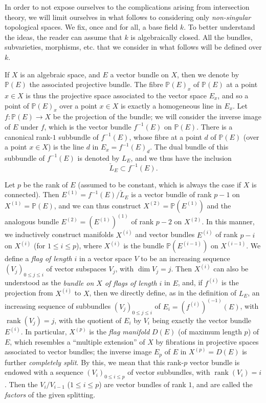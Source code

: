 \documentclass{article}
\begin{document}
In order to not expose ourselves to the complications arising from intersection theory, we will limit ourselves in what follows to considering only \emph{non-singular} topological spaces.
We fix, once and for all, a base field \(k\).
To better understand the ideas, the reader can assume that \(k\) is algebraically closed.
All the bundles, subvarieties, morphisms, etc. that we consider in what follows will be defined over \(k\).

If \(X\) is an algebraic space, and \(E\) a vector bundle on \(X\), then we denote by \(\mathbb{P}(E)\) the associated projective bundle.
The fibre \(\mathbb{P}(E)_x\) of \(\mathbb{P}(E)\) at a point \(x\in X\) is thus the projective space associated to the vector space \(E_x\), and so a point of \(\mathbb{P}(E)_x\) over a point \(x\in X\) is exactly a homogeneous line in \(E_x\).
Let \(f\colon\mathbb{P}(E)\to X\) be the projection of the bundle;
we will consider the inverse image of \(E\) under \(f\), which is the vector bundle \(f^{-1}(E)\) on \(\mathbb{P}(E)\).
There is a canonical rank-\(1\) subbundle of \(f^{-1}(E)\), whose fibre at a point \(d\) of \(\mathbb{P}(E)\) (over a point \(x\in X\)) is the line \(d\) in \(E_x=f^{-1}(E)_d\).
The dual bundle of this subbundle of \(f^{-1}(E)\) is denoted by \(L_E\), and we thus have the inclusion
\[
  \check{L}_E \subset f^{-1}(E).
\]

Let \(p\) be the rank of \(E\) (assumed to be constant, which is always the case if \(X\) is connected).
Then \(E^{(1)}=f^{-1}(E)/\check{L}_E\) is a vector bundle of rank \(p-1\) on \(X^{(1)}=\mathbb{P}(E)\), and we can thus construct \(X^{(2)}=\mathbb{P}(E^{(1)})\) and the analogous bundle \(E^{(2)}=(E^{(1)})^{(1)}\) of rank \(p-2\) on \(X^{(2)}\).
In this manner, we inductively construct manifolds \(X^{(i)}\) and vector bundles \(E^{(i)}\) of rank \(p-i\) on \(X^{(i)}\) (for \(1\leqslant i\leqslant p\)), where \(X^{(i)}\) is the bundle \(\mathbb{P}(E^{(i-1)})\) on \(X^{(i-1)}\).
We define a \emph{flag of length \(i\)} in a vector space \(V\) to be an increasing sequence \((V_j)_{0\leqslant j\leqslant i}\) of vector subspaces \(V_j\), with \(\dim V_j=j\).
Then \(X^{(i)}\) can also be understood as the \emph{bundle on \(X\) of flags of length \(i\)} in \(E\), and, if \(f^{(i)}\) is the projection from \(X^{(i)}\) to \(X\), then we directly define, as in the definition of \(L_E\), an increasing sequence of subbundles \((V_j)_{0\leqslant j\leqslant i}\) of \(E_i=(f^{(i)})^{(-1)}(E)\), with \(\operatorname{rank}(V_j)=j\), with the quotient of \(E_i\) by \(V_i\) being exactly the vector bundle \(E^{(i)}\).
In particular, \(X^{(p)}\) is the \emph{flag manifold} \(D(E)\) (of maximum length \(p\)) of \(E\), which resembles a ``multiple extension'' of \(X\) by fibrations in projective spaces associated to vector bundles;
the inverse image \(E_p\) of \(E\) in \(X^{(p)}=D(E)\) is further \emph{completely split}.
By this, we mean that this rank-\(p\) vector bundle is endowed with a sequence \((V_i)_{0\leqslant i\leqslant p}\) of vector subbundles,
with \(\operatorname{rank}(V_i)=i\).
Then the \(V_i/V_{i-1}\) (\(1\leqslant i\leqslant p\)) are vector bundles of rank \(1\), and are called the \emph{factors} of the given splitting.
\end{document}
